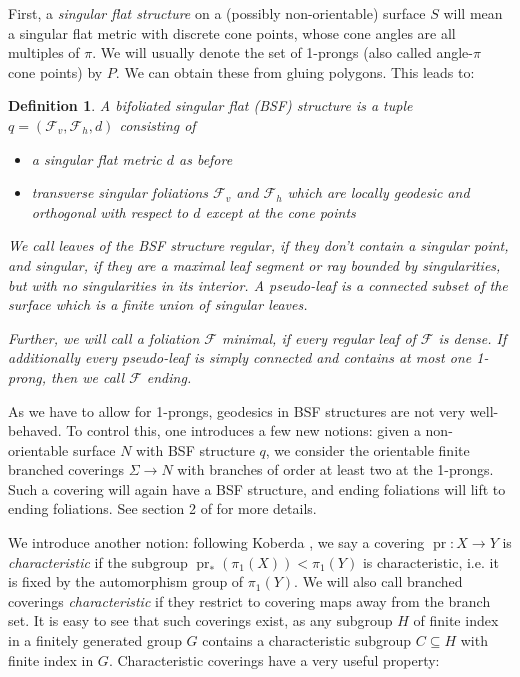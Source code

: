 \documentclass[10pt,a4paper]{amsart}
\newtheorem{definition}[theorem]{Definition}
\begin{document}
First, a \emph{singular flat structure} on a (possibly non-orientable) surface $S$ will mean a singular flat metric with discrete cone points, whose cone angles are all multiples of $\pi$.
We will usually denote the set of 1-prongs (also called angle-$\pi$ cone points) by $P$.
We can obtain these from gluing polygons.
This leads to:
\begin{definition}
    A \emph{bifoliated singular flat (BSF) structure} is a tuple $q = (\mathcal{F}_v, \mathcal{F}_h,d)$ consisting of\begin{itemize}
        \item a singular flat metric $d$ as before
        \item transverse singular foliations $\mathcal{F}_v$ and $\mathcal{F}_h$ which are locally geodesic and orthogonal with respect to $d$ except at the cone points
    \end{itemize}

We call leaves of the BSF structure \emph{regular}, if they don't contain a singular point, and \emph{singular}, if they are a maximal leaf segment or ray bounded by 
singularities, but with no singularities in its interior.
A \emph{pseudo-leaf} is a connected subset of the surface which is a finite union of singular leaves.

Further, we will call a foliation $\mathcal{F}$ \emph{minimal}, if every regular leaf of $\mathcal{F}$ is dense.
If additionally every pseudo-leaf is simply connected and contains at most one 1-prong, then we call $\mathcal{F}$ \emph{ending}.
\end{definition}

As we have to allow for 1-prongs, geodesics in BSF structures are not very well-behaved.
To control this, one introduces a few new notions:
given a non-orientable surface $N$ with BSF structure $q$, we consider the orientable finite branched coverings $\Sigma \rightarrow N$ with branches of order at least two at the 1-prongs.
Such a covering will again have a BSF structure, and ending foliations will lift to ending foliations.
See section 2 of \cite{BHW2} for more details.

We introduce another notion: 
following Koberda \cite{Koberda}, we say a covering $\operatorname{pr}\colon X\rightarrow Y$ is \emph{characteristic} if the subgroup $\operatorname{pr}_*(\pi_1(X)) < \pi_1(Y)$ is characteristic, i.e. it is fixed by the automorphism group of $\pi_1(Y)$.
We will also call branched coverings \emph{characteristic} if they restrict to covering maps away from the branch set.
It is easy to see that such coverings exist, as any subgroup $H$ of finite index in a finitely generated group $G$ contains a characteristic subgroup $C\subseteq H$ with finite index in $G$.
Characteristic coverings have a very useful property:
\end{document}

